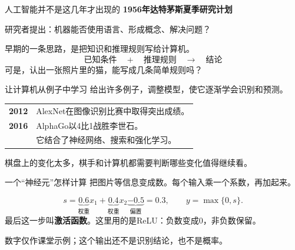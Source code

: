 \documentclass[aspectratio=169,10pt]{beamer}
\newcommand{\key}[1]{{\color{campusgreen}\bfseries #1}}
\newcommand{\smallbody}{\fontsize{11}{15}\selectfont}
\begin{document}
\begin{frame}[t]{人工智能并不是这几年才出现的}
  \key{1956年\quad 达特茅斯夏季研究计划}
  \par\vspace{3mm}
  研究者提出：机器能否使用语言、形成概念、解决问题？
  \par\vspace{7mm}
  早期的一条思路，是把知识和推理规则写给计算机。
  \[
    \text{已知条件}\quad +\quad \text{推理规则}\quad \longrightarrow\quad \text{结论}
  \]
  \vfill
  可是，认出一张照片里的猫，能写成几条简单规则吗？
\end{frame}

\begin{frame}[t]{让计算机从例子中学习}
  给出许多例子，调整模型，使它逐渐学会识别和预测。
  \par\vspace{7mm}
  \begin{tabular}{@{}lp{117mm}@{}}
    \key{2012} & AlexNet在图像识别比赛中取得突出成绩。\\[6mm]
    \key{2016} & AlphaGo以4比1战胜李世石。\\[2mm]
              & 它结合了神经网络、搜索和强化学习。\\
  \end{tabular}
  \vfill
  棋盘上的变化太多，棋手和计算机都需要判断哪些变化值得继续看。
\end{frame}

\begin{frame}[t,label=neuron]{一个“神经元”怎样计算}
  \smallbody
  把图片等信息变成数。每个输入乘一个系数，再加起来。
  \par\vspace{4mm}
  \begin{center}
  \end{center}
  \[
    s=\underbrace{0.6}_{\text{权重}}x_1+\underbrace{0.4}_{\text{权重}}x_2
      \underbrace{-0.5}_{\text{偏置}}=0.3,
    \qquad y=\max\{0,s\}.
  \]
  \vfill
  最后这一步叫\key{激活函数}。这里用的是ReLU：负数变成0，非负数保留。
  \par\vspace{2mm}
  {\fontsize{9}{12}\selectfont 数字仅作课堂示例；这个输出还不是识别结论，也不是概率。}
\end{frame}
\end{document}

